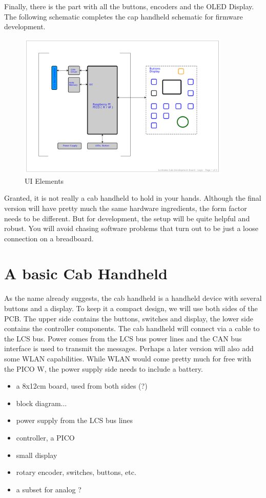 Finally, there is the part with all the buttons, encoders and the OLED Display. The following schematic completes the cap handheld schematic for firmware development.

\begin{figure}[htbp]
    \centering
    \includegraphics[page=3, width=0.9\textwidth]{./Schematics/Schematic_LcsNodes-Cab-Dev.pdf}
    \caption{UI Elements}
\end{figure}
\FloatBarrier

Granted, it is not really a cab handheld to hold in your hands. Although the final version will have pretty much the same hardware ingredients, the form factor needs to be different. But for development, the setup will be quite helpful and robust. You will avoid chasing software problems that turn out to be just a loose connection on a breadboard. 

\section{A basic Cab Handheld}

As the name already suggests, the cab handheld is a handheld device with several buttons and a display. To keep it a compact design, we will use both sides of the PCB. The upper side contains the buttons, switches and display, the lower side contains the controller components. The cab handheld will connect via a cable to the LCS bus. Power comes from the LCS bus power lines and the CAN bus interface is used to transmit the messages. Perhaps a later version will also add some WLAN capabilities. While WLAN would come pretty much for free with the PICO W, the power supply side needs to include a battery.

\begin{itemize}
\item a 8x12cm board, used from both sides (?)
\item block diagram...
\item power supply from the LCS bus lines
\item controller, a PICO
\item small display
\item rotary encoder, switches, buttons, etc.
\item a subset for analog ?
\end{itemize}

